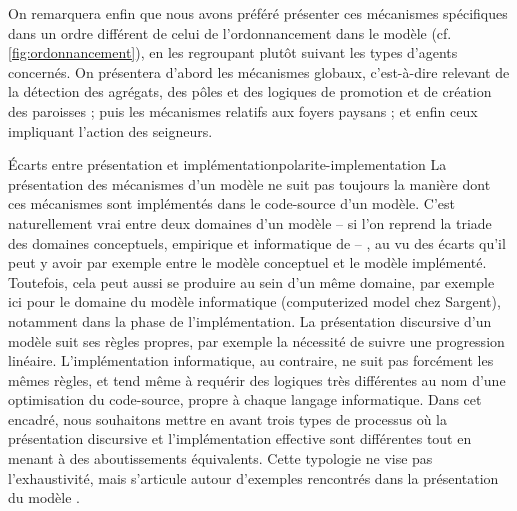 
On remarquera enfin que nous avons préféré présenter ces mécanismes spécifiques dans un ordre différent de celui de l'ordonnancement dans le modèle (cf. \cref{fig:ordonnancement}), en les regroupant plutôt suivant les types d'agents concernés.
On présentera d'abord les mécanismes \og globaux\fg{}, c'est-à-dire relevant de la détection des agrégats, des pôles et des logiques de promotion et de création des paroisses ; puis les mécanismes relatifs aux foyers paysans ; et enfin ceux impliquant l'action des seigneurs.

\bigskip 
\begin{encadre}{Écarts entre présentation et implémentation}{polarite-implementation}
		\renewcommand{\thempfootnote}{\alph{mpfootnote}}
La présentation des mécanismes d'un modèle ne suit pas toujours la manière dont ces mécanismes sont implémentés dans le code-source d'un modèle.
C'est naturellement vrai entre deux \og domaines\fg{} d'un modèle -- si l'on reprend la triade des domaines conceptuels, empirique et informatique de \textcite[\ppno~3, fig. 2]{sargent2009verification} --
, au vu des écarts qu'il peut y avoir par exemple entre le modèle conceptuel et le modèle implémenté.
Toutefois, cela peut aussi se produire au sein d'un même domaine, par exemple ici pour le domaine du modèle informatique (\og computerized model\fg{} chez Sargent), notamment dans la phase de l'implémentation.
La présentation discursive d'un modèle suit ses règles propres, par exemple la nécessité de suivre une progression linéaire.
L'implémentation informatique, au contraire, ne suit pas forcément les mêmes règles, et tend même à requérir des logiques très différentes au nom d'une \og optimisation\fg{} du code-source, propre à chaque langage informatique.
Dans cet encadré, nous souhaitons mettre en avant trois types de processus où la présentation discursive et l'implémentation effective sont différentes tout en menant à des aboutissements équivalents.
Cette typologie ne vise pas l'exhaustivité, mais s'articule autour d'exemples rencontrés dans la présentation du modèle \simfeodal{}.


\end{encadre}
